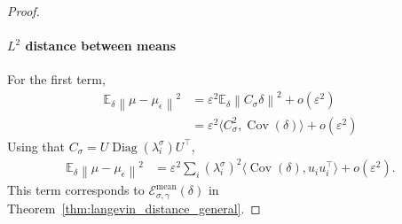 \documentclass[11pt]{article}
\newcommand{\norm}[1]{\left\|{#1}\right\|}
\newcommand{\EE}{\mathbb{E}}
\newcommand{\cov}{\operatorname{Cov}}
\newcommand{\diag}[1]{\operatorname{Diag}\left({#1}\right)}
\begin{document}
\begin{proof}
\paragraph{$L^2$ distance between means} For the first term,
\begin{align*}
\EE_{\delta} \norm{\mu - \mu_{\epsilon}}^2 
&=  \varepsilon^2 \EE_{\delta} \norm{C_\sigma \delta}^2 + o(\varepsilon^2) \\
&= \varepsilon^2  \langle C_\sigma^2, \cov(\delta) \rangle %
+ o(\varepsilon^2) 
\end{align*}
Using that $C_\sigma = U \diag{\lambda^\sigma_i} U^\top$, 
\begin{align*}
\EE_{\delta} \norm{\mu - \mu_{\epsilon}}^2 &= \varepsilon^2 \sum_i \left(\lambda^\sigma_i \right)^2 \langle \cov(\delta), u_i u_i^\top \rangle %
+ o(\varepsilon^2) .
\end{align*}
This term corresponds to $\mathcal{E}_{\sigma, \gamma}^{\text{mean}}(\delta)$ in Theorem~\ref{thm:langevin_distance_general}.



\end{proof}
\end{document}
